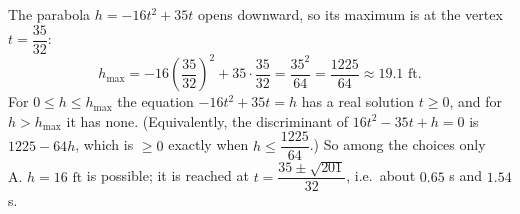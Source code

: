 The parabola $h=-16t^2+35t$ opens downward, so its maximum is at the vertex $t=\dfrac{35}{32}$:
\[h_{\max}=-16\left(\dfrac{35}{32}\right)^2+35\cdot\dfrac{35}{32}=\dfrac{35^2}{64}=\dfrac{1225}{64}\approx19.1\text{ ft}.\]
For $0\le h\le h_{\max}$ the equation $-16t^2+35t=h$ has a real solution $t\ge0$, and for $h>h_{\max}$ it has none. (Equivalently, the discriminant of $16t^2-35t+h=0$ is $1225-64h$, which is $\ge0$ exactly when $h\le\dfrac{1225}{64}$.) So among the choices only $\boxed{\text{A. }h=16\text{ ft}}$ is possible; it is reached at $t=\dfrac{35\pm\sqrt{201}}{32}$, i.e.\ about $0.65$ s and $1.54$ s.
